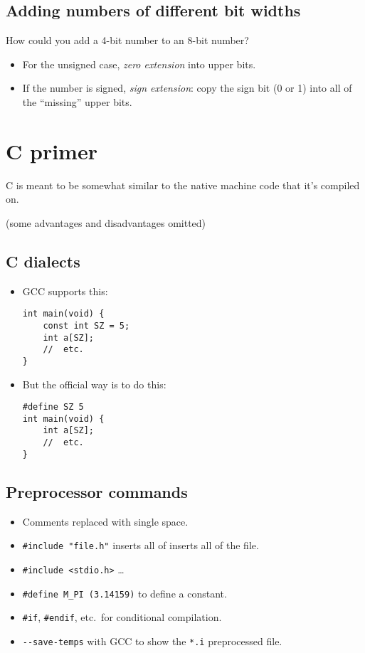 \subsection{Adding numbers of different bit widths}
How could you add a 4-bit number to an 8-bit number?
\begin{itemize}
	\item For the unsigned case, \emph{zero extension} into upper bits.
	\item If the number is signed, \emph{sign extension}: copy the sign bit (0 or 1) into all of the ``missing'' upper bits.
\end{itemize}

\section{C primer}
C is meant to be somewhat similar to the native machine code that it's compiled on. 

(some advantages and disadvantages omitted)

\subsection{C dialects}
\begin{itemize}
	\item GCC supports this:
\begin{verbatim}
int main(void) {
	const int SZ = 5;
	int a[SZ];
	//  etc.
}
\end{verbatim}
	\item But the official way is to do this:
\begin{verbatim}
#define SZ 5
int main(void) {
	int a[SZ];
	//  etc.
}
\end{verbatim}
\end{itemize}

\subsection{Preprocessor commands}
\begin{itemize}
	\item Comments replaced with single space.
	\item \texttt{\#include "file.h"} inserts all of {inserts all of the file}.
	\item \texttt{\#include <stdio.h>} \ldots
	\item \texttt{\#define M\_PI (3.14159)} to define a constant.
	\item \texttt{\#if}, \texttt{\#endif}, etc.\ for conditional compilation.
	\item \texttt{-{}-save-temps} with GCC to show the \texttt{*.i} preprocessed file.
\end{itemize}

